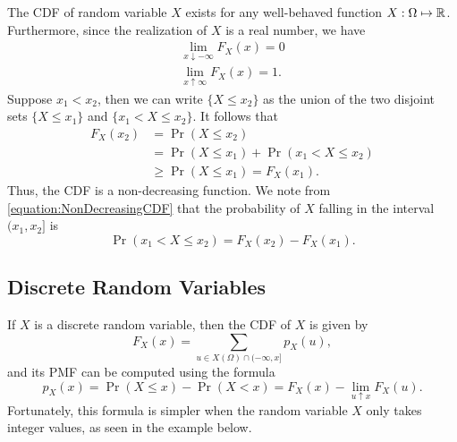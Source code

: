 The CDF of random variable $X$ exists for any well-behaved function $X : \Omega \mapsto \mathbb{R}$.
Furthermore, since the realization of $X$ is a real number, we have
\begin{gather*}
\lim_{x \downarrow - \infty} F_X (x) = 0 \\
\lim_{x \uparrow \infty} F_X (x) = 1.
\end{gather*}
Suppose $x_1 < x_2$, then we can write $\{ X \leq x_2 \}$ as the union of the two disjoint sets $\{ X \leq x_1 \}$ and $\{ x_1 < X \leq x_2 \}$.
It follows that
\begin{equation} \label{equation:NonDecreasingCDF}
\begin{split}
F_X (x_2) &= \Pr (X \leq x_2) \\
&= \Pr (X \leq x_1) + \Pr (x_1 < X \leq x_2) \\
&\geq \Pr (X \leq x_1) = F_X (x_1).
\end{split}
\end{equation}
Thus, the CDF is a non-decreasing function.
We note from \eqref{equation:NonDecreasingCDF} that the probability of $X$ falling in the interval $(x_1, x_2]$ is
\begin{equation} \label{equation:IntervalCDF}
\Pr (x_1 < X \leq x_2) = F_X (x_2) - F_X (x_1).
\end{equation}


\subsection{Discrete Random Variables}

If $X$ is a discrete random variable, then the CDF of $X$ is given by
\begin{equation*}
F_X (x) = \sum_{u \in X(\Omega) \cap (-\infty, x]} p_X (u),
\end{equation*}
and its PMF can be computed using the formula
\begin{equation*}
p_X (x) = \Pr (X \leq x) - \Pr (X < x) = F_X (x) - \lim_{u \uparrow x} F_X (u).
\end{equation*}
Fortunately, this formula is simpler when the random variable $X$ only takes integer values, as seen in the example below.


